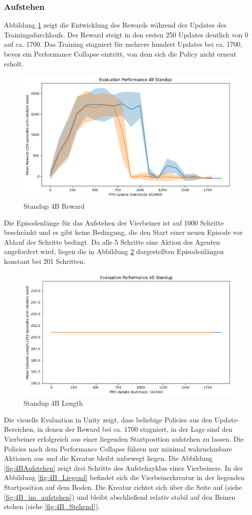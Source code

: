 \subsubsection{Aufstehen}
Abbildung \ref{fig:Standup4B_Reward} zeigt die Entwicklung des Rewards während der Updates des Trainingsdurchlaufs. Der Reward steigt in den ersten 250 Updates deutlich von 0 auf ca. 1700. Das Training stagniert für mehrere hundert Updates bei ca. 1700, bevor ein Performance Collapse eintritt, von dem sich die Policy nicht erneut erholt.

\begin{figure}[ht]
    \centering
    \includegraphics[width=0.5\linewidth]{resources/img/results/Standup4B_Reward.png}
    \caption{Standup 4B Reward}\label{fig:Standup4B_Reward}
\end{figure}

Die Episodenlänge für das Aufstehen der Vierbeiner ist auf 1000 Schritte beschränkt und es gibt keine Bedingung, die den Start einer neuen Episode vor Ablauf der Schritte bedingt. Da alle 5 Schritte eine Aktion des Agenten angefordert wird, liegen die in Abbildung \ref{fig:Standup4B_Length} dargestellten Episodenlängen konstant bei 201 Schritten.

\begin{figure}[ht]
    \centering
    \includegraphics[width=0.5\linewidth]{resources/img/results/Standup4B_Length.png}
    \caption{Standup 4B Length}\label{fig:Standup4B_Length}
\end{figure}

Die visuelle Evaluation in Unity zeigt, dass beliebige Policies aus den Update-Bereichen, in denen der Reward bei ca. 1700 stagniert, in der Lage sind den Vierbeiner erfolgreich aus einer liegenden Startposition aufstehen zu lassen. Die Policies nach dem Performance Collapse führen nur minimal wahrnehmbare Aktionen aus und die Kreatur bleibt unbewegt liegen.\newline
Die Abbildung \ref{fig:4BAufstehen} zeigt drei Schritte des Aufstehzyklus eines Vierbeiners. In der Abbildung \ref{fig:4B_Liegend} befindet sich die Vierbeinerkreatur in der liegenden Startposition auf dem Boden. Die Kreatur richtet sich über die Seite auf (siehe \ref{fig:4B_im_aufstehen}) und bleibt abschließend relativ stabil auf den Beinen stehen (siehe \ref{fig:4B_Stehend}).


